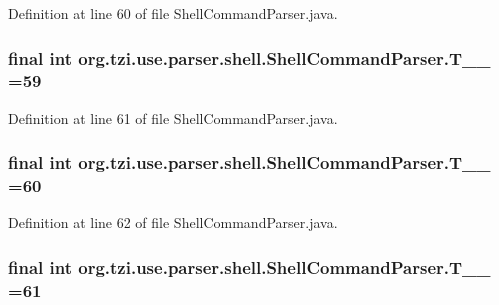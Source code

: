 Definition at line 60 of file Shell\-Command\-Parser.\-java.

\hypertarget{classorg_1_1tzi_1_1use_1_1parser_1_1shell_1_1_shell_command_parser_ae4a2515a1d0a718b349160333b521c23}{
\subsubsection[{T\-\_\-\-\_\-59}]{\setlength{\rightskip}{0pt plus 5cm}final int org.\-tzi.\-use.\-parser.\-shell.\-Shell\-Command\-Parser.\-T\-\_\-\-\_ =59\hspace{0.3cm}{\ttfamily [static]}}}\label{classorg_1_1tzi_1_1use_1_1parser_1_1shell_1_1_shell_command_parser_ae4a2515a1d0a718b349160333b521c23}


Definition at line 61 of file Shell\-Command\-Parser.\-java.

\hypertarget{classorg_1_1tzi_1_1use_1_1parser_1_1shell_1_1_shell_command_parser_a8906a932feb12b4deafb99722997544c}{
\subsubsection[{T\-\_\-\-\_\-60}]{\setlength{\rightskip}{0pt plus 5cm}final int org.\-tzi.\-use.\-parser.\-shell.\-Shell\-Command\-Parser.\-T\-\_\-\-\_ =60\hspace{0.3cm}{\ttfamily [static]}}}\label{classorg_1_1tzi_1_1use_1_1parser_1_1shell_1_1_shell_command_parser_a8906a932feb12b4deafb99722997544c}


Definition at line 62 of file Shell\-Command\-Parser.\-java.

\hypertarget{classorg_1_1tzi_1_1use_1_1parser_1_1shell_1_1_shell_command_parser_a0fdc5239a772761b1c45f6c2ed1a5daf}{
\subsubsection[{T\-\_\-\-\_\-61}]{\setlength{\rightskip}{0pt plus 5cm}final int org.\-tzi.\-use.\-parser.\-shell.\-Shell\-Command\-Parser.\-T\-\_\-\-\_ =61\hspace{0.3cm}{\ttfamily [static]}}}\label{classorg_1_1tzi_1_1use_1_1parser_1_1shell_1_1_shell_command_parser_a0fdc5239a772761b1c45f6c2ed1a5daf}


